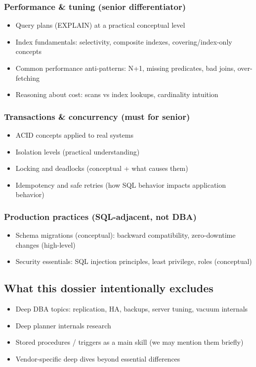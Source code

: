 \subsubsection{Performance \& tuning (senior differentiator)}
\begin{itemize}
    \item Query plans (EXPLAIN) at a practical conceptual level
    \item Index fundamentals: selectivity, composite indexes, covering/index-only concepts
    \item Common performance anti-patterns: N+1, missing predicates, bad joins, over-fetching
    \item Reasoning about cost: scans vs index lookups, cardinality intuition
\end{itemize}

\newpage
\subsubsection{Transactions \& concurrency (must for senior)}
\begin{itemize}
    \item ACID concepts applied to real systems
    \item Isolation levels (practical understanding)
    \item Locking and deadlocks (conceptual + what causes them)
    \item Idempotency and safe retries (how SQL behavior impacts application behavior)
\end{itemize}

\subsubsection{Production practices (SQL-adjacent, not DBA)}
\begin{itemize}
    \item Schema migrations (conceptual): backward compatibility, zero-downtime changes (high-level)
    \item Security essentials: SQL injection principles, least privilege, roles (conceptual)
\end{itemize}

\subsection{What this dossier intentionally excludes}
\begin{itemize}
    \item Deep DBA topics: replication, HA, backups, server tuning, vacuum internals
    \item Deep planner internals research
    \item Stored procedures / triggers as a main skill (we may mention them briefly)
    \item Vendor-specific deep dives beyond essential differences
\end{itemize}